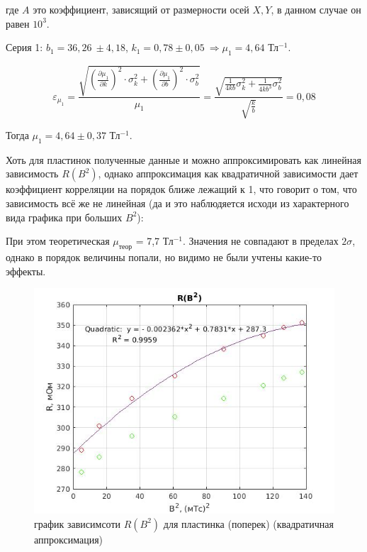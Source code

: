 \documentclass[a4paper, 12pt]{article}%
\begin{document}
где $A$ это коэффициент, зависящий от размерности осей $X,Y$, в данном случае он равен $10^{3}$.

Серия 1: $b_1 = 36,26\ \pm 4,18$, $k_1 = 0,78 \pm 0,05\ \Rightarrow \mu_1 = 4,64$ Тл$^{-1}$.

\[ \varepsilon_{\mu_1} = \frac{\sqrt{ (\frac{\partial \mu_1}{\partial k}) ^2 \cdot \sigma^2_{k} + (\frac{\partial \mu_1}{\partial b}) ^2 \cdot \sigma^2_{b}  }}{\mu_1} = \frac{\sqrt{  \frac{1}{4kb} \sigma^2_{k} + \frac{1}{4kb^3} \sigma^2_{b} }}{\sqrt{\frac{k}{b}}} = 0,08\]

Тогда $\mu_1 = 4,64 \pm 0,37$ Тл$^{-1}$.



Хоть для пластинок полученные данные и можно аппроксимировать как линейная зависимость $R(B^2)$, однако аппроксимация как квадратичной зависимости дает коэффициент корреляции на порядок ближе лежащий к 1, что говорит о том, что зависимость всё же не линейная (да и это наблюдяется исходи из характерного вида графика при больших $B^2$):

При этом теоретическая $\mu_{\text{теор}}$ = 7,7 Тл$^{-1}$. Значения не совпадают в пределах $2\sigma$, однако в порядок величины попали, но видимо не были учтены какие-то эффекты.

\begin{center}
\begin{figure}[!h]
    \centering
    \includegraphics[width = 10 cm]{graph2(no_disk)(quadratic_1).jpg}
    \caption{график зависимсоти $R(B^2)$ для пластинка (поперек) (квадратичная аппроксимация)}
    \label{ser2_q}
\end{figure}
\end{center}
\end{document}
